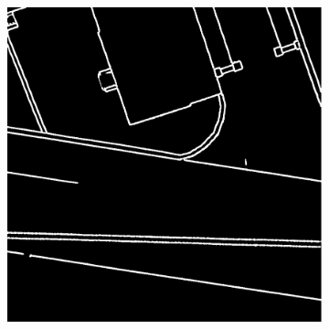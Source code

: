 \documentclass[12pt]{article}
\begin{document}
\begin{figure}[H]
\begin{subfigure}[b]{.28\textwidth}
\begin{minipage}[t]{1\linewidth}
		\end{minipage}
	\end{subfigure}
	\begin{subfigure}[b]{.28\textwidth}
		\begin{minipage}[t]{1\linewidth}
			\centering
			\includegraphics[width=1\linewidth]{images/patches/pre6.png}
		\end{minipage}
	\end{subfigure}

	\vspace{+2mm}
    \setcounter{subfigure}{0}
    

\end{figure}
\end{document}
